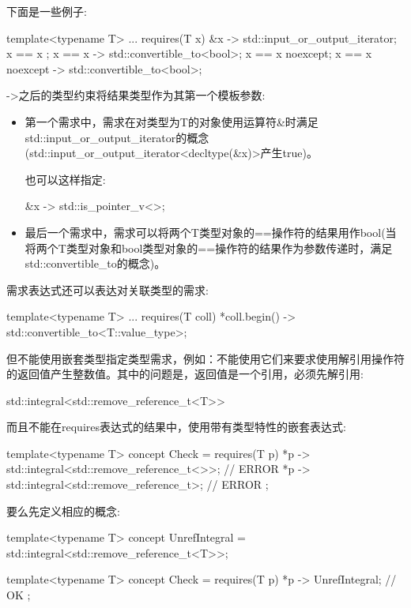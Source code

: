 下面是一些例子:

\begin{cpp}
template<typename T>
... requires(T x) {
	{ &x } -> std::input_or_output_iterator;
	{ x == x };
	{ x == x } -> std::convertible_to<bool>;
	{ x == x }noexcept;
	{ x == x }noexcept -> std::convertible_to<bool>;
}
\end{cpp}

->之后的类型约束将结果类型作为其第一个模板参数:

\begin{itemize}
\item
第一个需求中，需求在对类型为T的对象使用运算符\&时满足std::input\_or\_output\_iterator的概念(std::input\_or\_output\_iterator<decltype(\&x)>产生true)。

也可以这样指定:

\begin{cpp}
{ &x } -> std::is_pointer_v<>;
\end{cpp}

\item
最后一个需求中，需求可以将两个T类型对象的==操作符的结果用作bool(当将两个T类型对象和bool类型对象的==操作符的结果作为参数传递时，满足std::convertible\_to的概念)。
\end{itemize}

需求表达式还可以表达对关联类型的需求:

\begin{cpp}
template<typename T>
... requires(T coll) {
	{ *coll.begin() } -> std::convertible_to<T::value_type>;
}
\end{cpp}

但不能使用嵌套类型指定类型需求，例如：不能使用它们来要求使用解引用操作符的返回值产生整数值。其中的问题是，返回值是一个引用，必须先解引用:

\begin{cpp}
std::integral<std::remove_reference_t<T>>
\end{cpp}

而且不能在requires表达式的结果中，使用带有类型特性的嵌套表达式:

\begin{cpp}
template<typename T>
concept Check = requires(T p) {
	{ *p } -> std::integral<std::remove_reference_t<>>; // ERROR
	{ *p } -> std::integral<std::remove_reference_t>; // ERROR
};
\end{cpp}

要么先定义相应的概念:

\begin{cpp}
template<typename T>
concept UnrefIntegral = std::integral<std::remove_reference_t<T>>;

template<typename T>
concept Check = requires(T p) {
	{ *p } -> UnrefIntegral; // OK
};
\end{cpp}

